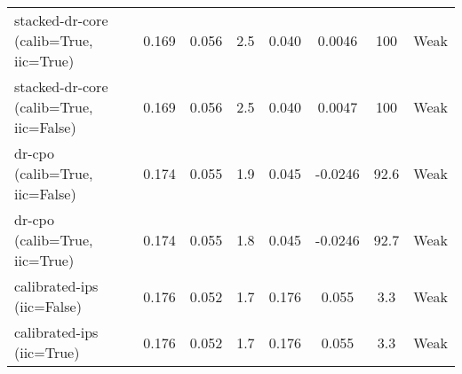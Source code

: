 \begin{table}[htbp]
\begin{tabular}{l|ccccccc}
stacked-dr-core (calib=True, iic=True) & 0.169 & 0.056 & 2.5 & 0.040 & 0.0046 & 100 & Weak \\
stacked-dr-core (calib=True, iic=False) & 0.169 & 0.056 & 2.5 & 0.040 & 0.0047 & 100 & Weak \\
dr-cpo (calib=True, iic=False) & 0.174 & 0.055 & 1.9 & 0.045 & -0.0246 & 92.6 & Weak \\
dr-cpo (calib=True, iic=True) & 0.174 & 0.055 & 1.8 & 0.045 & -0.0246 & 92.7 & Weak \\
calibrated-ips (iic=False) & 0.176 & 0.052 & 1.7 & 0.176 & 0.055 & 3.3 & Weak \\
calibrated-ips (iic=True) & 0.176 & 0.052 & 1.7 & 0.176 & 0.055 & 3.3 & Weak \\
\bottomrule
\end{tabular}
\end{table}
